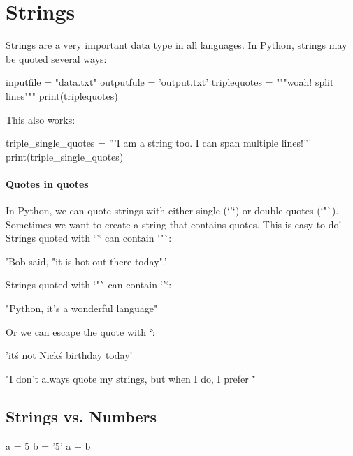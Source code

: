 \documentclass[12pt]{article} \newif\ifsolution\solutiontrue %
\begin{document}
\section{Strings}
Strings are a very important data type in all languages.  
In Python, strings may be quoted several ways:

\begin{python} inputfile = "data.txt"
outputfule = 'output.txt'
triplequotes = """woah!
  split lines"""
print(triplequotes) \end{python}


This also works:

\begin{python}
triple_single_quotes = '''I am a string too.
I can span multiple lines!'''
print(triple_single_quotes)
\end{python}

\paragraph{Quotes in quotes}
In Python, we can quote strings with either single (`'`) or double quotes (`"`). Sometimes we want to create a string that contains quotes.  This is easy to do! Strings quoted with `'` can contain `"`:

\begin{python}
'Bob said, "it is hot out there today".'
\end{python}

Strings quoted with `"` can contain `'`:

\begin{python}
"Python, it's a wonderful language"
\end{python}

Or we can escape the quote with `\`:

\begin{python}
'it\'s not Nick\'s birthday today'
\end{python}

\begin{python}
"I don't always quote my strings, but when I do, I prefer \""
\end{python}

\subsection{Strings vs. Numbers}
\begin{python}
a = 5
b = '5'
a + b
\end{python}
\end{document}
